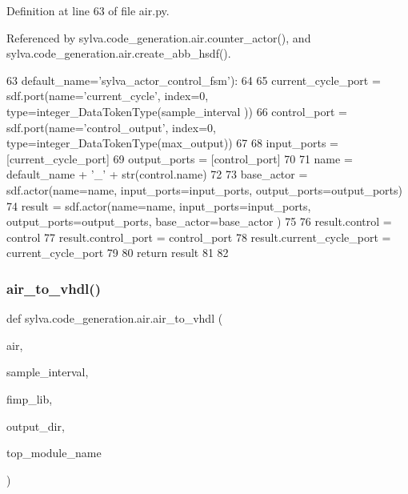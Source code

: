 Definition at line 63 of file air.\+py.



Referenced by sylva.\+code\+\_\+generation.\+air.\+counter\+\_\+actor(), and sylva.\+code\+\_\+generation.\+air.\+create\+\_\+abb\+\_\+hsdf().


\begin{DoxyCode}
63                     default\_name=\textcolor{stringliteral}{'sylva\_actor\_control\_fsm'}):
64 
65     current\_cycle\_port = sdf.port(name=\textcolor{stringliteral}{'current\_cycle'}, index=0, type=integer\_DataTokenType(sample\_interval
      ))
66     control\_port = sdf.port(name=\textcolor{stringliteral}{'control\_output'}, index=0, type=integer\_DataTokenType(max\_output))
67 
68     input\_ports = [current\_cycle\_port]
69     output\_ports = [control\_port]
70 
71     name = default\_name + \textcolor{stringliteral}{'\_'} + str(control.name)
72 
73     base\_actor = sdf.actor(name=name, input\_ports=input\_ports, output\_ports=output\_ports)
74     result = sdf.actor(name=name, input\_ports=input\_ports, output\_ports=output\_ports, base\_actor=base\_actor
      )
75 
76     result.control = control
77     result.control\_port = control\_port
78     result.current\_cycle\_port = current\_cycle\_port
79 
80     \textcolor{keywordflow}{return} result
81 
82 
\end{DoxyCode}
\mbox{\label{namespacesylva_1_1code__generation_1_1air_a12c49366c61395ad719575c8715849cc}} 
\subsubsection{\texorpdfstring{air\+\_\+to\+\_\+vhdl()}{air\_to\_vhdl()}}
{\footnotesize\ttfamily def sylva.\+code\+\_\+generation.\+air.\+air\+\_\+to\+\_\+vhdl (\begin{DoxyParamCaption}\item[{}]{air,  }\item[{}]{sample\+\_\+interval,  }\item[{}]{fimp\+\_\+lib,  }\item[{}]{output\+\_\+dir,  }\item[{}]{top\+\_\+module\+\_\+name }\end{DoxyParamCaption})}



